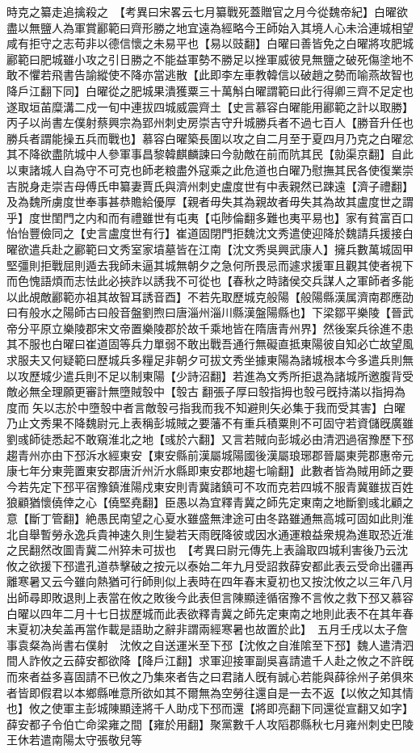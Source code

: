 時克之纂走追擒殺之　【考異曰宋畧云七月纂戰死蓋贈官之月今從魏帝紀】白曜欲盡以無鹽人為軍賞酈範曰齊形勝之地宜遠為經略今王師始入其境人心未洽連城相望咸有拒守之志苟非以德信懷之未易平也【易以豉翻】白曜曰善皆免之白曜將攻肥城酈範曰肥城雖小攻之引日勝之不能益軍勢不勝足以挫軍威彼見無鹽之破死傷塗地不敢不懼若飛書告諭縱使不降亦當逃散【此即李左車教韓信以破趙之勢而喻燕故智也降戶江翻下同】白曜從之肥城果潰獲粟三十萬斛白曜謂範曰此行得卿三齊不足定也遂取垣苖糜溝二戍一旬中連拔四城威震齊土【史言慕容白曜能用酈範之計以取勝】　丙子以尚書左僕射蔡興宗為郢州刺史房崇吉守升城勝兵者不過七百人【勝音升任也勝兵者謂能操五兵而戰也】慕容白曜築長圍以攻之自二月至于夏四月乃克之白曜忿其不降欲盡阬城中人參軍事昌黎韓麒麟諫曰今勍敵在前而阬其民【勍渠京翻】自此以東諸城人自為守不可克也師老粮盡外寇乘之此危道也白曜乃慰撫其民各使復業崇吉脱身走崇吉母傅氏申纂妻賈氏與濟州刺史盧度世有中表親然已踈遠【濟子禮翻】及為魏所虜度世奉事甚恭贍給優厚【親者毋失其為親故者毋失其為故其盧度世之謂乎】度世閨門之内和而有禮雖世有屯夷【屯陟倫翻多難也夷平易也】家有貧富百口怡怡豐儉同之【史言盧度世有行】崔道固閉門拒魏沈文秀遣使迎降於魏請兵援接白曜欲遣兵赴之酈範曰文秀室家墳墓皆在江南【沈文秀吳興武康人】擁兵數萬城固甲堅彊則拒戰屈則遁去我師未逼其城無朝夕之急何所畏忌而遽求援軍且觀其使者視下而色愧語煩而志怯此必挾詐以誘我不可從也【春秋之時諸侯交兵謀人之軍師者多能以此覘敵酈範亦祖其故智耳誘音酉】不若先取歷城克般陽【般陽縣漢属濟南郡應劭曰有般水之陽師古曰般音盤劉煦曰唐淄州淄川縣漢盤陽縣也】下梁鄒平樂陵【晉武帝分平原立樂陵郡宋文帝置樂陵郡於故千乘地皆在隋唐青州界】然後案兵徐進不患其不服也白曜曰崔道固等兵力單弱不敢出戰吾通行無礙直抵東陽彼自知必亡故望風求服夫又何疑範曰歷城兵多糧足非朝夕可拔文秀坐據東陽為諸城根本今多遣兵則無以攻歷城少遣兵則不足以制東陽【少詩沼翻】若進為文秀所拒退為諸城所邀腹背受敵必無全理願更審計無墮賊彀中【彀古翻張子厚曰彀指拇也彀弓旣持滿以指拇為度而矢以志於中墮彀中者言敵彀弓指我而我不知避則矢必集于我而受其害】白曜乃止文秀果不降魏尉元上表稱彭城賊之要藩不有重兵積粟則不可固守若資儲旣廣雖劉彧師徒悉起不敢窺淮北之地【彧於六翻】又言若賊向彭城必由清泗過宿豫歷下邳趨青州亦由下邳泝水經東安【東安縣前漢屬城陽國後漢屬琅琊郡晉屬東莞郡惠帝元康七年分東莞置東安郡唐沂州沂水縣即東安郡地趨七喻翻】此數者皆為賊用師之要今若先定下邳平宿豫鎮淮陽戍東安則青冀諸鎮可不攻而克若四城不服青冀雖拔百姓狼顧猶懷僥倖之心【僥堅堯翻】臣愚以為宜釋青冀之師先定東南之地斷劉彧北顧之意【斷丁管翻】絶愚民南望之心夏水雖盛無津途可由冬路雖通無高城可固如此則淮北自舉暫勞永逸兵貴神速久則生變若天雨旣降彼或因水通運粮益衆規為進取恐近淮之民翻然改圖青冀二州猝未可拔也　【考異曰尉元傳先上表論取四城利害後乃云沈攸之欲援下邳遣孔道恭擊破之按元以泰始二年九月受詔救薛安都此表云受命出疆再離寒暑又云今雖向熱猶可行師則似上表時在四年春末夏初也又按沈攸之以三年八月出師尋即敗退則上表當在攸之敗後今此表但言陳顯逹循宿豫不言攸之救下邳又慕容白曜以四年二月十七日拔歷城而此表欲釋青冀之師先定東南之地則此表不在其年春末夏初决矣盖再當作載是語助之辭非謂兩經寒暑也故置於此】　五月壬戌以太子詹事袁粲為尚書右僕射　沈攸之自送運米至下邳【沈攸之自淮隂至下邳】魏人遣清泗間人詐攸之云薛安都欲降【降戶江翻】求軍迎接軍副吳喜請遣千人赴之攸之不許旣而來者益多喜固請不已攸之乃集來者告之曰君諸人旣有誠心若能與薛徐州子弟俱來者皆即假君以本鄉縣唯意所欲如其不爾無為空勞往還自是一去不返【以攸之知其情也】攸之使軍主彭城陳顯逹將千人助戍下邳而還【將即亮翻下同還從宣翻又如字】薛安都子令伯亡命梁雍之間【雍於用翻】聚黨數千人攻䧟郡縣秋七月雍州刺史巴陵王休若遣南陽太守張敬兒等